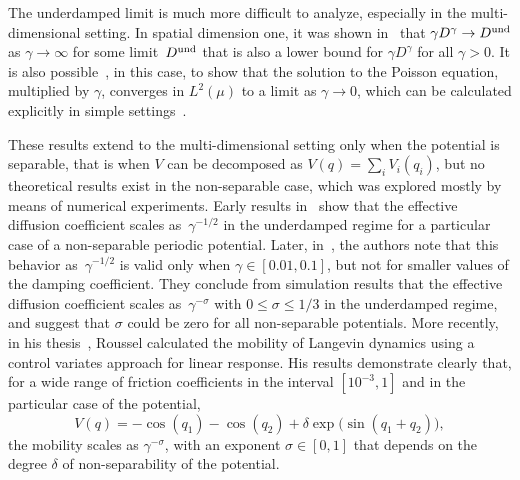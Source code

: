 \documentclass[11pt,a4paper]{article}
\theoremstyle{plain}
\numberwithin{equation}{section}
\renewcommand{\leq}{\leqslant}
\begin{document}
The underdamped limit is much more difficult to analyze,
especially in the multi-dimensional setting.
In spatial dimension one, it was shown in~\cite{MR2394704} that $\gamma D^{\gamma} \to D^{\rm und}$ as $\gamma \to \infty$ for some limit~$D^{\rm und}$
that is also a lower bound for $\gamma D^{\gamma}$ for all $\gamma > 0$.
It is also possible~\cite[Lemma 3.4]{MR2394704}, in this case,
to show that the solution to the Poisson equation,
multiplied by $\gamma$, converges in $L^2(\mu)$ to a limit as $\gamma \to 0$,
which can be calculated explicitly in simple settings~\cite{MR2427108}.

These results extend to the multi-dimensional setting only when the potential is separable,
that is when $V$ can be decomposed as $V(q) = \sum_i V_i(q_i)$,
but no theoretical results exist in the non-separable case,
which was explored mostly by means of numerical experiments.
Early results in~\cite{chen1996surface} show that the effective diffusion coefficient scales as~$\gamma^{-1/2}$ in the underdamped regime for a particular case of a non-separable periodic potential.
Later, in~\cite{Braun02},
the authors note that this behavior as~$\gamma^{-1/2}$ is valid only when $\gamma \in [0.01, 0.1]$,
but not for smaller values of the damping coefficient.
They conclude from simulation results that the effective diffusion coefficient scales as~$\gamma^{-\sigma}$ with $0 \leq \sigma \leq 1/3$ in the underdamped regime,
and suggest that $\sigma$ could be zero for all non-separable potentials.
More recently, in his thesis~\cite{roussel_thesis},
Roussel calculated the mobility of Langevin dynamics  using a control variates approach for linear response.
His results demonstrate clearly that, for a wide range of friction coefficients in the interval $[10^{-3}, 1]$ and in the particular case of the potential,
\[
    V(q) = - \cos(q_1) - \cos(q_2) + \delta \exp \bigl(\sin(q_1 + q_2)\bigr),
\]
the mobility scales as $\gamma^{- \sigma}$,
with an exponent $\sigma \in [0, 1]$ that depends on the degree $\delta$ of non-separability of the potential.
\end{document}
